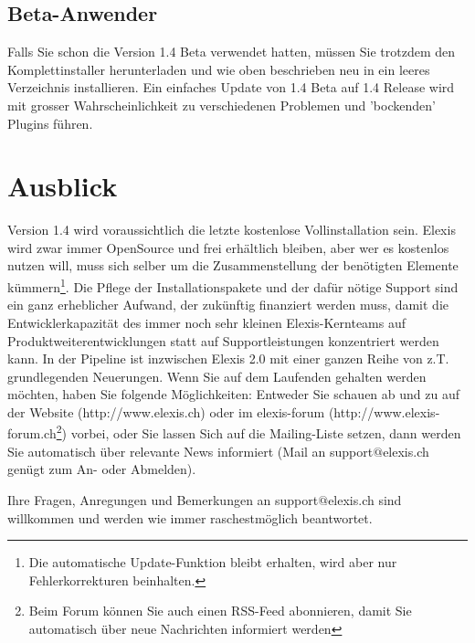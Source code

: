\documentclass[a4paper]{scrartcl}
\begin{document}
\subsection{Beta-Anwender}
Falls Sie schon die Version 1.4 Beta verwendet hatten, müssen Sie trotzdem den Komplettinstaller herunterladen und wie oben beschrieben neu in ein leeres Verzeichnis installieren. Ein einfaches Update von 1.4 Beta auf 1.4 Release wird mit grosser Wahrscheinlichkeit zu verschiedenen Problemen und 'bockenden' Plugins  führen.

\section{Ausblick}
Version 1.4 wird voraussichtlich die letzte kostenlose Vollinstallation sein. Elexis wird zwar immer OpenSource und frei erhältlich bleiben, aber wer es kostenlos nutzen will, muss sich selber um die Zusammenstellung der benötigten Elemente kümmern\footnote{Die automatische Update-Funktion bleibt erhalten, wird aber nur Fehlerkorrekturen beinhalten.}. Die Pflege der Installationspakete und der dafür nötige Support sind ein ganz erheblicher Aufwand, der zukünftig finanziert werden muss, damit die Entwicklerkapazität des immer noch sehr kleinen Elexis-Kernteams auf Produktweiterentwicklungen statt auf Supportleistungen konzentriert werden kann. In der Pipeline ist inzwischen Elexis 2.0 mit einer ganzen Reihe von z.T. grundlegenden Neuerungen. Wenn Sie auf dem Laufenden gehalten werden möchten, haben Sie folgende Möglichkeiten: Entweder Sie schauen ab und zu auf der Website (http://www.elexis.ch) oder im elexis-forum (http://www.elexis-forum.ch\footnote{Beim Forum können Sie auch einen RSS-Feed abonnieren, damit Sie automatisch über neue Nachrichten informiert werden}) vorbei, oder Sie lassen Sich auf die Mailing-Liste setzen, dann werden Sie automatisch über relevante News informiert (Mail an support$@$elexis.ch genügt zum An- oder Abmelden).

\medskip

Ihre Fragen, Anregungen und Bemerkungen an support$@$elexis.ch sind willkommen und werden wie immer raschestmöglich beantwortet.
\end{document}
